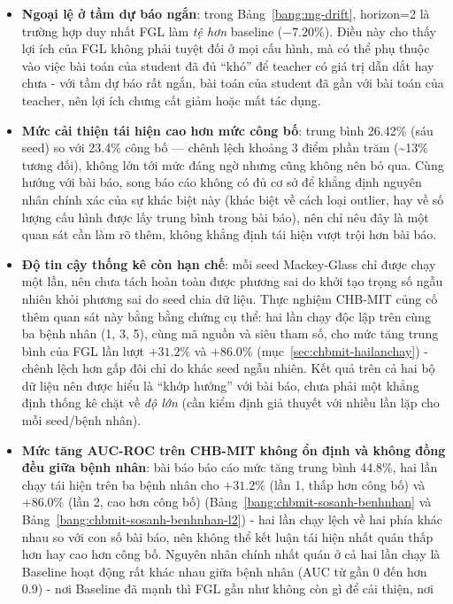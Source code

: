 \begin{itemize}
	\item \textbf{Ngoại lệ ở tầm dự báo ngắn}: trong Bảng~\ref{bang:mg-drift}, horizon=2 là
	trường hợp duy nhất FGL làm \textit{tệ hơn} baseline ($-7.20\%$). Điều này cho thấy lợi ích
	của FGL không phải tuyệt đối ở mọi cấu hình, mà có thể phụ thuộc vào việc bài toán của
	student đã đủ ``khó'' để teacher có giá trị dẫn dắt hay chưa - với tầm dự báo rất ngắn,
	bài toán của student đã gần với bài toán của teacher, nên lợi ích chưng cất giảm hoặc mất
	tác dụng.
	\item \textbf{Mức cải thiện tái hiện cao hơn mức công bố}: trung bình 26.42\% (sáu seed) so
	với 23.4\% công bố --- chênh lệch khoảng 3 điểm phần trăm (\textasciitilde 13\% tương đối),
	không lớn tới mức đáng ngờ nhưng cũng không nên bỏ qua. Cùng hướng với bài báo, song báo cáo
	không có đủ cơ sở để khẳng định nguyên nhân chính xác của sự khác biệt này (khác biệt về cách
	loại outlier, hay về số lượng cấu hình được lấy trung bình trong bài báo), nên chỉ nêu đây là
	một quan sát cần làm rõ thêm, không khẳng định tái hiện vượt trội hơn bài báo.
	\item \textbf{Độ tin cậy thống kê còn hạn chế}: mỗi seed Mackey-Glass chỉ được chạy một
	lần, nên chưa tách hoàn toàn được phương sai do khởi tạo trọng số ngẫu nhiên khỏi phương sai
	do seed chia dữ liệu. Thực nghiệm CHB-MIT củng cố thêm quan sát này bằng bằng chứng cụ thể:
	hai lần chạy độc lập trên cùng ba bệnh nhân (1, 3, 5), cùng mã nguồn và siêu tham số, cho
	mức tăng trung bình của FGL lần lượt $+31.2\%$ và $+86.0\%$
	(mục~\ref{sec:chbmit-hailanchay}) - chênh lệch hơn gấp đôi chỉ do khác seed ngẫu nhiên.
	Kết quả trên cả hai bộ dữ liệu nên được hiểu là ``khớp hướng'' với bài báo, chưa phải một
	khẳng định thống kê chặt về \textit{độ lớn} (cần kiểm định giả thuyết với nhiều lần lặp cho
	mỗi seed/bệnh nhân).
	\item \textbf{Mức tăng AUC-ROC trên CHB-MIT không ổn định và không đồng đều giữa bệnh
	nhân}: bài báo báo cáo mức tăng trung bình 44.8\%, hai lần chạy tái hiện trên ba bệnh nhân
	cho $+31.2\%$ (lần 1, thấp hơn công bố) và $+86.0\%$ (lần 2, cao hơn công bố)
	(Bảng~\ref{bang:chbmit-sosanh-benhnhan} và Bảng~\ref{bang:chbmit-sosanh-benhnhan-l2}) - hai
	lần chạy lệch về hai phía khác nhau so với con số bài báo, nên không thể kết luận tái hiện
	nhất quán thấp hơn hay cao hơn công bố. Nguyên nhân chính nhất quán ở cả hai lần chạy là
	Baseline hoạt động rất khác nhau giữa bệnh nhân (AUC từ gần
	0 đến hơn 0.9) - nơi Baseline đã mạnh thì FGL gần như không còn gì để cải thiện, nơi

\end{itemize}
